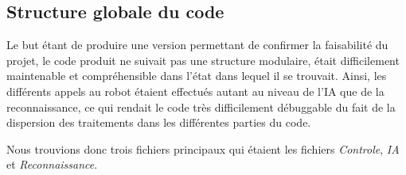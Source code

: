     \subsection{Structure globale du code}
    \par Le but étant de produire une version permettant de confirmer la faisabilité du projet, 
    le code produit ne suivait pas une structure modulaire, était difficilement maintenable et 
    compréhensible dans l'état dans lequel il se trouvait. Ainsi, les différents appels au robot 
    étaient effectués autant au niveau de l'IA que de la reconnaissance, ce qui rendait le code 
    très difficilement débuggable du fait de la dispersion des traitements dans les différentes 
    parties du code.
    
    \par Nous trouvions donc trois fichiers principaux qui étaient les fichiers \textit{Controle}, \textit{IA} et \textit{Reconnaissance}.

\pagebreak
